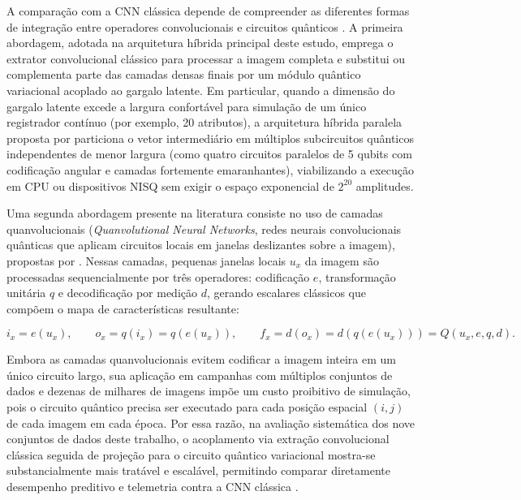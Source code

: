 \documentclass[
    12pt,
    openright,
    oneside,
    a4paper,
    english,
    brazil
]{abntex2}
\begin{document}
A comparação com a CNN clássica depende de compreender as diferentes formas de integração entre operadores convolucionais e circuitos quânticos \cite{LeCun2015,bergholm2018pennylane}. A primeira abordagem, adotada na arquitetura híbrida principal deste estudo, emprega o extrator convolucional clássico para processar a imagem completa e substitui ou complementa parte das camadas densas finais por um módulo quântico variacional acoplado ao gargalo latente. Em particular, quando a dimensão do gargalo latente excede a largura confortável para simulação de um único registrador contínuo (por exemplo, 20 atributos), a arquitetura híbrida paralela proposta por  particiona o vetor intermediário em múltiplos subcircuitos quânticos independentes de menor largura (como quatro circuitos paralelos de 5 qubits com codificação angular e camadas fortemente emaranhantes), viabilizando a execução em CPU ou dispositivos NISQ sem exigir o espaço exponencial de \(2^{20}\) amplitudes.

Uma segunda abordagem presente na literatura consiste no uso de camadas quanvolucionais (\textit{Quanvolutional Neural Networks}, redes neurais convolucionais quânticas que aplicam circuitos locais em janelas deslizantes sobre a imagem), propostas por . Nessas camadas, pequenas janelas locais \(u_x\) da imagem são processadas sequencialmente por três operadores: codificação \(e\), transformação unitária \(q\) e decodificação por medição \(d\), gerando escalares clássicos que compõem o mapa de características resultante:

\begin{equation}
\label{eq:quanvolucao}
i_x = e(u_x),
\qquad
o_x = q(i_x) = q(e(u_x)),
\qquad
f_x = d(o_x) = d(q(e(u_x))) = Q(u_x, e, q, d).
\end{equation}

Embora as camadas quanvolucionais evitem codificar a imagem inteira em um único circuito largo, sua aplicação em campanhas com múltiplos conjuntos de dados e dezenas de milhares de imagens impõe um custo proibitivo de simulação, pois o circuito quântico precisa ser executado para cada posição espacial \((i,j)\) de cada imagem em cada época. Por essa razão, na avaliação sistemática dos nove conjuntos de dados deste trabalho, o acoplamento via extração convolucional clássica seguida de projeção para o circuito quântico variacional mostra-se substancialmente mais tratável e escalável, permitindo comparar diretamente desempenho preditivo e telemetria contra a CNN clássica \cite{henderson2020quanvolutional,senokosov2024qml}.
\end{document}
